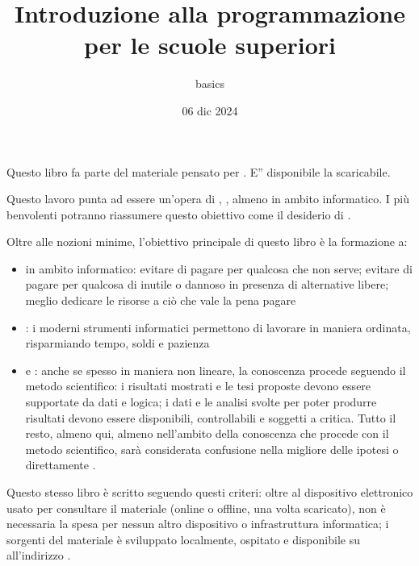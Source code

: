 \documentclass[letterpaper,10pt,italian]{jupyterBook}
\title{Introduzione alla programmazione per le scuole superiori}
\date{06 dic 2024}
\author{basics}
\begin{document}
\pagestyle{empty}
\sphinxmaketitle
\pagestyle{plain}
\sphinxtableofcontents
\pagestyle{normal}
\label{\detokenize{intro::doc}}


\sphinxAtStartPar
Questo libro fa parte del materiale pensato per . E” disponibile la  scaricabile.

\sphinxAtStartPar
{} Questo lavoro punta ad essere un’opera di  ,   , almeno in ambito informatico. I più benvolenti potranno riassumere questo obiettivo come il desiderio di .

\sphinxAtStartPar
Oltre alle nozioni minime, l’obiettivo principale di questo libro è la formazione a:
\begin{itemize}
\item {} 
\sphinxAtStartPar
{} in ambito informatico: evitare di pagare per qualcosa che non serve; evitare di pagare per qualcosa di inutile o dannoso in presenza di alternative libere; meglio dedicare le risorse a ciò che vale la pena pagare

\item {} 
\sphinxAtStartPar
{}: i moderni strumenti informatici permettono di lavorare in maniera ordinata, risparmiando tempo, soldi e pazienza

\item {} 
\sphinxAtStartPar
{} e : anche se spesso in maniera non lineare, la conoscenza procede seguendo il metodo scientifico: i risultati mostrati e le tesi proposte devono essere supportate da dati e logica; i dati e le analisi svolte per poter produrre risultati devono essere disponibili, controllabili e soggetti a critica. Tutto il resto, almeno qui, almeno nell’ambito della conoscenza che procede con il metodo scientifico, sarà considerata confusione nella migliore delle ipotesi o direttamente .

\end{itemize}

\sphinxAtStartPar
Questo stesso libro è scritto seguendo questi criteri: oltre al dispositivo elettronico usato per consultare il materiale (online o offline, una volta scaricato), non è necessaria la spesa per nessun altro dispositivo o infrastruttura informatica; i sorgenti del materiale è sviluppato localmente, ospitato e disponibile su  all’indirizzo .
\end{document}
